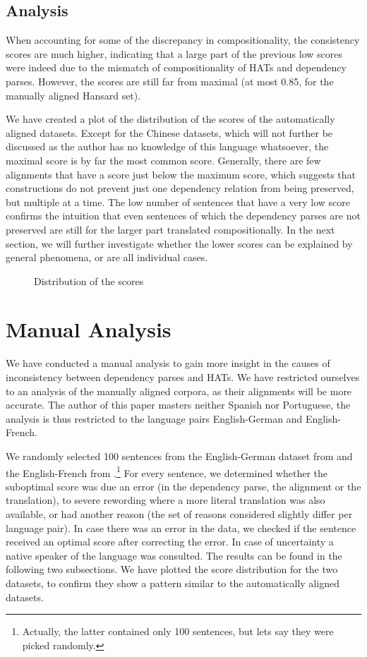 \subsection{Analysis}

When accounting for some of the discrepancy in compositionality, the consistency scores are much higher, indicating that a large part of the previous low scores were indeed due to the mismatch of compositionality of HATs and dependency parses. However, the scores are still far from maximal (at most 0.85, for the manually aligned Hansard set). 

We have created a plot of the distribution of the scores of the automatically aligned datasets. Except for the Chinese datasets, which will not further be discussed as the author has no knowledge of this language whatsoever, the maximal score is by far the most common score. Generally, there are few alignments that have a score just below the maximum score, which suggests that constructions do not prevent just one dependency relation from being preserved, but multiple at a time. The low number of sentences that have a very low score confirms the intuition that even sentences of which the dependency parses are not preserved are still for the larger part translated compositionally. In the next section, we will further investigate whether the lower scores can be explained by general phenomena, or are all individual cases. 

\begin{figure}[!ht]

\caption{Distribution of the scores}\label{fig:scoredstrib}
\end{figure}

\section{Manual Analysis}
\label{sec:man}

We have conducted a manual analysis to gain more insight in the causes of inconsistency between dependency parses and HATs. We have restricted ourselves to an analysis of the manually aligned corpora, as their alignments will be more accurate. The author of this paper masters neither Spanish nor Portuguese, the analysis is thus restricted to the language pairs English-German and English-French.

We randomly selected 100 sentences from the English-German dataset from \cite{pado2006optimal} and the English-French from \cite{graca2008building}.\footnote{Actually, the latter contained only 100 sentences, but lets say they were picked randomly.} For every sentence, we determined whether the suboptimal score was due an error (in the dependency parse, the alignment or the translation), to severe rewording where a more literal translation was also available, or had another reason (the set of reasons considered slightly differ per language pair). In case there was an error in the data, we checked if the sentence received an optimal score after correcting the error. In case of uncertainty a native speaker of the language was consulted. The results can be found in the following two subsections. We have plotted the score distribution for the two datasets, to confirm they show a pattern similar to the automatically aligned datasets.

